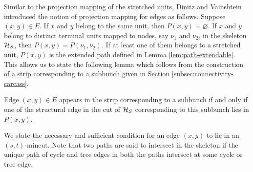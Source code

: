 Similar to the projection mapping of the stretched units, Dinitz and Vainshtein \cite{DBLP:journals/siamcomp/DinitzV00} introduced the notion of projection mapping for edges as follows. Suppose $(x,y)\in E$. If $x$ and $y$ belong to the same unit, then $P(x,y) = \varnothing$. If $x$ and $y$ belong to distinct terminal units mapped to nodes, say $\nu_1$ and $\nu_2$, in the skeleton ${\cal H}_S$, then $P(x,y) = P(\nu_1,\nu_2)$. If at least one of them belongs to a stretched unit, $P(x,y)$ is the extended path defined in Lemma \ref{lem:path-extendable}. This allows us to state the following lemma which follows from the construction of a strip corresponding to a subbunch given in Section \ref{subsec:connectivity-carcass}.

\begin{lemma}
Edge $(x,y)\in E$ appears in the strip corresponding to a subbunch if and only if one of the structural edge in the cut of ${\cal H}_S$ corresponding to this subbunch lies in $P(x,y)$.
\label{lem:edge-path-intersect-subbunch}
\end{lemma}

We state the necessary and sufficient condition for an edge $(x,y)$ to lie in an $(s,t)$-mincut. Note that two paths are said to intersect in the skeleton if the unique path of cycle and tree edges in both the paths intersect at some cycle or tree edge.


